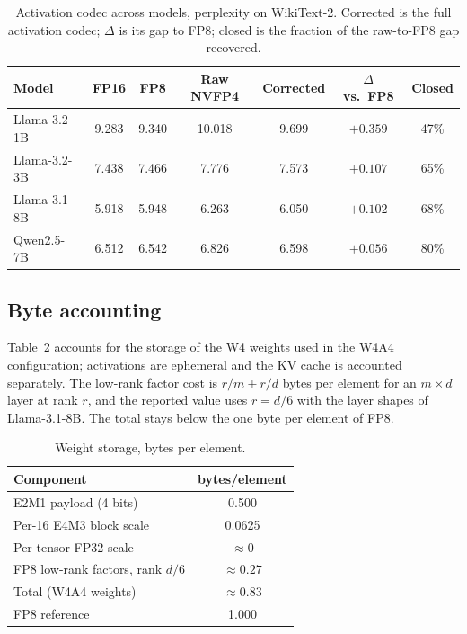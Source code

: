 \documentclass[11pt]{article}
\begin{document}
\begin{table}[h]\centering\small
\caption{Activation codec across models, perplexity on WikiText-2. Corrected is the full
activation codec; $\Delta$ is its gap to FP8; closed is the fraction of the raw-to-FP8
gap recovered.}\label{tab:cross}
\begin{tabular}{lcccccc}
\toprule
Model & FP16 & FP8 & Raw NVFP4 & Corrected & $\Delta$ vs.\ FP8 & Closed \\
\midrule
Llama-3.2-1B & 9.283 & 9.340 & 10.018 & 9.699 & $+0.359$ & 47\% \\
Llama-3.2-3B & 7.438 & 7.466 & 7.776 & 7.573 & $+0.107$ & 65\% \\
Llama-3.1-8B & 5.918 & 5.948 & 6.263 & 6.050 & $+0.102$ & 68\% \\
Qwen2.5-7B & 6.512 & 6.542 & 6.826 & 6.598 & $+0.056$ & 80\% \\
\bottomrule
\end{tabular}
\end{table}

\subsection{Byte accounting}
Table~\ref{tab:bytes} accounts for the storage of the W4 weights used in the W4A4
configuration; activations are ephemeral and the KV cache is accounted separately. The low-rank factor
cost is $r/m + r/d$ bytes per element for an $m\times d$ layer at rank $r$, and the
reported value uses $r=d/6$ with the layer shapes of Llama-3.1-8B. The total stays below
the one byte per element of FP8.

\begin{table}[h]\centering\small
\caption{Weight storage, bytes per element.}\label{tab:bytes}
\begin{tabular}{lc}
\toprule
Component & bytes/element \\
\midrule
E2M1 payload (4 bits) & 0.500 \\
Per-16 E4M3 block scale & 0.0625 \\
Per-tensor FP32 scale & $\approx 0$ \\
FP8 low-rank factors, rank $d/6$ & $\approx 0.27$ \\
\midrule
Total (W4A4 weights) & $\approx 0.83$ \\
FP8 reference & 1.000 \\
\bottomrule
\end{tabular}
\end{table}
\end{document}
